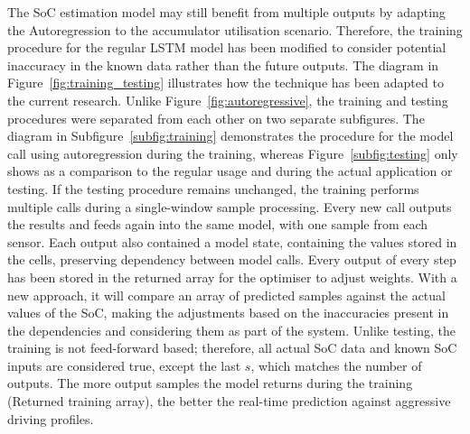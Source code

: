 %
%
The SoC estimation model may still benefit from multiple outputs by adapting the Autoregression to the accumulator utilisation scenario.
Therefore, the training procedure for the regular LSTM model has been modified to consider potential inaccuracy in the known data rather than the future outputs.
The diagram in Figure~\ref{fig:training_testing} illustrates how the technique has been adapted to the current research.
Unlike Figure~\ref{fig:autoregressive}, the training and testing procedures were separated from each other on two separate subfigures.
The diagram in \mbox{Subfigure~\ref{subfig:training}} demonstrates the procedure for the model call using autoregression during the training, whereas Figure~\ref{subfig:testing} only shows as a comparison to the regular usage and during the actual application or testing.
If the testing procedure remains unchanged, the training performs multiple calls during a single-window sample processing.
Every new call outputs the results and feeds again into the same model, with one sample from each sensor.
Each output also contained a model state, containing the values stored in the cells, preserving dependency between model calls.
Every output of every step has been stored in the returned array for the optimiser to adjust weights.
With a new approach, it will compare an array of predicted samples against the actual values of the SoC, making the adjustments based on the inaccuracies present in the dependencies and considering them as part of the system.
Unlike testing, the training is not feed-forward based; therefore, all actual SoC data and known SoC inputs are considered true, except the last $s$, which matches the number of outputs.
The more output samples the model returns during the training (Returned training array), the better the real-time prediction against aggressive driving profiles.
